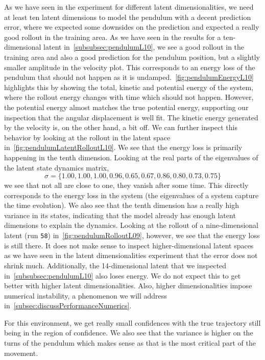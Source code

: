 		As we have seen in the experiment for different latent dimensionalities, we need at least ten latent dimensions to model the pendulum with a decent prediction error, where we expected some downsides on the prediction and expected a really good rollout in the training area. As we have seen in the results for a ten-dimensional latent in~\autoref{subsubsec:pendulumL10}, we see a good rollout in the training area and also a good prediction for the pendulum position, but a slightly smaller amplitude in the velocity plot. This corresponds to an energy loss of the pendulum that should not happen as it is undamped.~\autoref{fig:pendulumEnergyL10} highlights this by showing the total, kinetic and potential energy of the system, where the rollout energy changes with time which should not happen. However, the potential energy almost matches the true potential energy, supporting our inspection that the angular displacement is well fit. The kinetic energy generated by the velocity is, on the other hand, a bit off. We can further inspect this behavior by looking at the rollout in the latent space in~\autoref{fig:pendulumLatentRolloutL10}. We see that the energy loss is primarily happening in the tenth dimension. Looking at the real parts of the eigenvalues of the latent state dynamics matrix,
		\begin{equation*}
			\sigma = \{ 1.00, 1.00, 1.00, 0.96, 0.65, 0.67, 0.86, 0.80, 0.73, 0.75 \}
		\end{equation*}
		we see that not all are close to one, \ie they vanish after some time. This directly corresponds to the energy loss in the system (the eigenvalues of a system capture the time evolution). We also see that the tenth dimension has a really high variance in its states, indicating that the model already has enough latent dimensions to explain the dynamics. Looking at the rollout of a nine-dimensional latent (run \texttt{58}) in~\autoref{fig:pendulumRolloutL09}, however, we see that the energy loss is still there. It does not make sense to inspect higher-dimensional latent spaces as we have seen in the latent dimensionalities experiment that the error does not shrink much. Additionally, the 14-dimensional latent that we inspected in~\autoref{subsubsec:pendulumL10} also loses energy. We do not expect this to get better with higher latent dimensionalities. Also, higher dimensionalities impose numerical instability, a phenomenon we will address in~\autoref{subsec:discussPerformanceNumerics}.

		For this environment, we get really small confidences with the true trajectory still being in the region of confidence. We also see that the variance is higher on the turns of the pendulum which makes sense as that is the most critical part of the movement.

